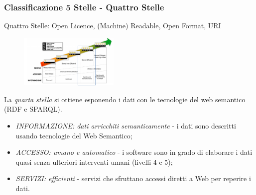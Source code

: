 \documentclass[8pt]{beamer}
\begin{document}
\begin{frame}
  \frametitle{Classificazione 5 Stelle - Quattro Stelle}
  
  Quattro Stelle: Open Licence, (Machine) Readable, Open Format, URI

  \begin{figure}
     \includegraphics[width=180px]{stella4.png} 
  \end{figure}
  
  La \emph{quarta stella} si ottiene esponendo i dati con le tecnologie del web semantico (RDF e SPARQL).
  \vspace{\baselineskip}

  \begin{itemize}[<+->]
   \item \emph{INFORMAZIONE: dati arricchiti semanticamente} - i dati sono descritti usando tecnologie del Web Semantico;
   \item \emph{ACCESSO: umano e automatico} - i software sono in grado di elaborare i dati quasi senza ulteriori 
   interventi umani (livelli 4 e 5);
   \item \emph{SERVIZI: efficienti} - servizi che sfruttano accessi diretti a Web per reperire i dati.
  \end{itemize}
\end{frame}
\end{document}
